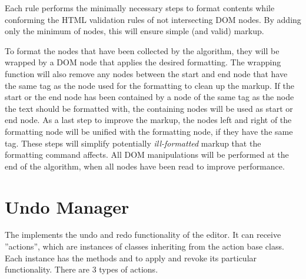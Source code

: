 Each rule performs the minimally necessary steps to format contents while conforming the HTML validation rules of not intersecting DOM nodes. By adding only the minimum of nodes, this will ensure simple (and valid) markup.

To format the nodes that have been collected by the algorithm, they will be wrapped by a DOM node that applies the desired formatting. The wrapping function will also remove any nodes between the start and end node that have the same tag as the node used for the formatting to clean up the markup. If the start or the end node has been contained by a node of the same tag as the node the text should be formatted with, the containing nodes will be used as start or end node. As a last step to improve the markup, the nodes left and right of the formatting node will be unified with the formatting node, if they have the same tag. These steps will simplify potentially \textit{ill-formatted} markup that the formatting command affects. All DOM manipulations will be performed at the end of the algorithm, when all nodes have been read to improve performance.







\section{Undo Manager}
\label{sec:undo_manager}

The  implements the undo and redo functionality of the editor. It can receive ''actions'', which are instances of classes inheriting from the  action base class. Each instance has the methods  and  to apply and revoke its particular functionality. There are 3 types of actions.

